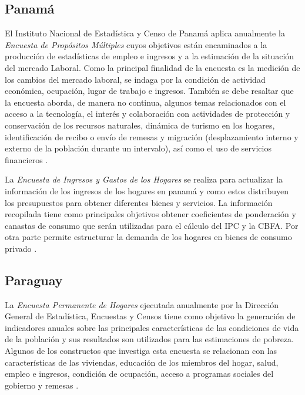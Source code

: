 \documentclass[12pt,spanish,]{book}
\begin{document}
\hypertarget{panama}{%
\subsection*{Panamá}\label{panama}}

El Instituto Nacional de Estadística y Censo de Panamá aplica anualmente la \emph{Encuesta de Propósitos Múltiples} cuyos objetivos están encaminados a la producción de estadísticas de empleo e ingresos y a la estimación de la situación del mercado Laboral. Como la principal finalidad de la encuesta es la medición de los cambios del mercado laboral, se indaga por la condición de actividad económica, ocupación, lugar de trabajo e ingresos. También se debe resaltar que la encuesta aborda, de manera no continua, algunos temas relacionados con el acceso a la tecnología, el interés y colaboración con actividades de protección y conservación de los recursos naturales, dinámica de turismo en los hogares, identificación de recibo o envío de remesas y migración (desplazamiento interno y externo de la población durante un intervalo), así como el uso de servicios financieros \autocite{INEC-PA}.

La \emph{Encuesta de Ingresos y Gastos de los Hogares} se realiza para actualizar la información de los ingresos de los hogares en panamá y como estos distribuyen los presupuestos para obtener diferentes bienes y servicios. La información recopilada tiene como principales objetivos obtener coeficientes de ponderación y canastas de consumo que serán utilizadas para el cálculo del IPC y la CBFA. Por otra parte permite estructurar la demanda de los hogares en bienes de consumo privado \autocite{INEC2-PA}.

\hypertarget{paraguay}{%
\subsection*{Paraguay}\label{paraguay}}

La \emph{Encuesta Permanente de Hogares} ejecutada anualmente por la Dirección General de Estadística, Encuestas y Censos tiene como objetivo la generación de indicadores anuales sobre las principales características de las condiciones de vida de la población y sus resultados son utilizados para las estimaciones de pobreza. Algunos de los constructos que investiga esta encuesta se relacionan con las características de las viviendas, educación de los miembros del hogar, salud, empleo e ingresos, condición de ocupación, acceso a programas sociales del gobierno y remesas \autocite{DGEEC-PY}.
\end{document}

